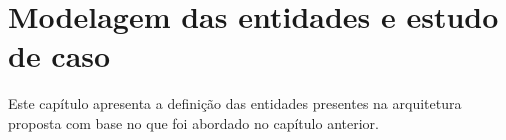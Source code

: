 \chapter{Modelagem das entidades e estudo de caso}

Este capítulo apresenta a definição das entidades presentes na arquitetura proposta com base no que foi abordado no capítulo anterior.


